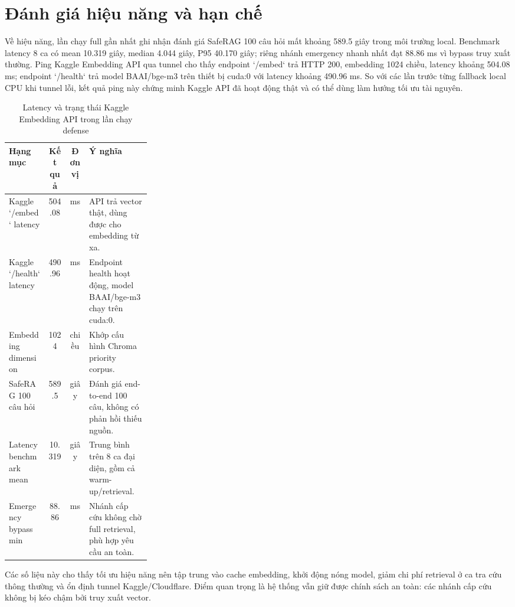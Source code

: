 \section{Đánh giá hiệu năng và hạn chế}

Về hiệu năng, lần chạy full gần nhất ghi nhận đánh giá SafeRAG 100 câu hỏi mất khoảng 589.5 giây trong môi trường local. Benchmark latency 8 ca có mean 10.319 giây, median 4.044 giây, P95 40.170 giây; riêng nhánh emergency nhanh nhất đạt 88.86 ms vì bypass truy xuất thường. Ping Kaggle Embedding API qua tunnel cho thấy endpoint `/embed` trả HTTP 200, embedding 1024 chiều, latency khoảng 504.08 ms; endpoint `/health` trả model BAAI/bge-m3 trên thiết bị cuda:0 với latency khoảng 490.96 ms. So với các lần trước từng fallback local CPU khi tunnel lỗi, kết quả ping này chứng minh Kaggle API đã hoạt động thật và có thể dùng làm hướng tối ưu tài nguyên.

\begin{table}[H]
\centering
\small
\caption{Latency và trạng thái Kaggle Embedding API trong lần chạy defense}
\begin{tabularx}{\linewidth}{L{0.28\linewidth} C C Y}
\toprule
\textbf{Hạng mục} & \textbf{Kết quả} & \textbf{Đơn vị} & \textbf{Ý nghĩa} \\
\midrule
Kaggle `/embed` latency & 504.08 & ms & API trả vector thật, dùng được cho embedding từ xa. \\
Kaggle `/health` latency & 490.96 & ms & Endpoint health hoạt động, model BAAI/bge-m3 chạy trên cuda:0. \\
Embedding dimension & 1024 & chiều & Khớp cấu hình Chroma priority corpus. \\
SafeRAG 100 câu hỏi & 589.5 & giây & Đánh giá end-to-end 100 câu, không có phản hồi thiếu nguồn. \\
Latency benchmark mean & 10.319 & giây & Trung bình trên 8 ca đại diện, gồm cả warm-up/retrieval. \\
Emergency bypass min & 88.86 & ms & Nhánh cấp cứu không chờ full retrieval, phù hợp yêu cầu an toàn. \\
\bottomrule
\end{tabularx}
\end{table}

Các số liệu này cho thấy tối ưu hiệu năng nên tập trung vào cache embedding, khởi động nóng model, giảm chi phí retrieval ở ca tra cứu thông thường và ổn định tunnel Kaggle/Cloudflare. Điểm quan trọng là hệ thống vẫn giữ được chính sách an toàn: các nhánh cấp cứu không bị kéo chậm bởi truy xuất vector.

